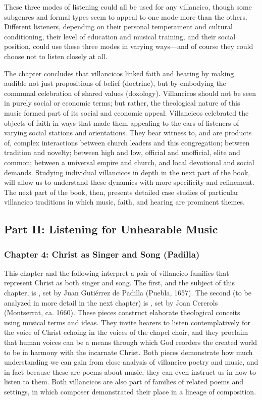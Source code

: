 \documentclass[tt]{vcbook-proposal}
\begin{document}
These three modes of listening could all be used for any villancico, though some subgenres and formal types seem to appeal to one mode more than the others.
Different listeners, depending on their personal temperament and cultural conditioning, their level of education and musical training, and their social position, could use these three modes in varying ways---and of course they could choose not to listen closely at all.

The chapter concludes that villancicos linked faith and hearing by making audible not just propositions of belief (doctrine), but by embodying the communal celebration of shared values (doxology).
Villancicos should not be seen in purely social or economic terms; but rather, the theological nature of this music formed part of its social and economic appeal.
Villancicos celebrated the objects of faith in ways that made them appealing to the ears of listeners of varying social stations and orientations.
They bear witness to, and are products of, complex interactions between church leaders and this congregation; between tradition and novelty; between high and low, official and unofficial, elite and common; between a universal empire and church, and local devotional and social demands.
Studying individual villancicos in depth in the next part of the book, will allow us to understand these dynamics with more specificity and refinement.
The next part of the book, then, presents detailed case studies of particular villancico traditions in which music, faith, and hearing are prominent themes.


\subsection{Part II: Listening for Unhearable Music}

\subsubsection{Chapter 4: Christ as Singer and Song (Padilla)}

This chapter and the following interpret a pair of villancico families that represent Christ as both singer and song.
The first, and the subject of this chapter, is , set by Juan Gutiérrez de Padilla (Puebla, 1657).
The second (to be analyzed in more detail in the next chapter) is , set by Joan Cererols (Montserrat, ca. 1660).
These pieces construct elaborate theological conceits using musical terms and ideas.
They invite hearers to listen contemplatively for the voice of Christ echoing in the voices of the chapel choir, and they proclaim that human voices can be a means through which God reorders the created world to be in harmony with the incarnate Christ.
Both pieces demonstrate how much understanding we can gain from close analysis of villancico poetry and music, and in fact because these are poems about music, they can even instruct us in how to listen to them.
Both villancicos are also part of families of related poems and settings, in which composer demonstrated their place in a lineage of  composition.
\end{document}
